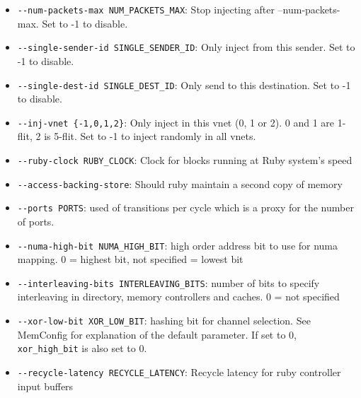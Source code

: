 \documentclass{article}
\begin{document}
\begin{itemize}
	\item \verb|--num-packets-max NUM_PACKETS_MAX|: Stop injecting after --num-packets-max. Set to -1 to disable.
	\item \verb|--single-sender-id SINGLE_SENDER_ID|: Only inject from this sender. Set to -1 to disable.
	\item \verb|--single-dest-id SINGLE_DEST_ID|: Only send to this destination. Set to -1 to disable.
	\item \verb|--inj-vnet {-1,0,1,2}|: Only inject in this vnet (0, 1 or 2). 0 and 1 are 1-flit, 2 is 5-flit. Set to -1 to inject randomly in all vnets.
	\item \verb|--ruby-clock RUBY_CLOCK|: Clock for blocks running at Ruby system's speed
	\item \verb|--access-backing-store|: Should ruby maintain a second copy of memory
	\item \verb|--ports PORTS|: used of transitions per cycle which is a proxy for the number of ports.
	\item \verb|--numa-high-bit NUMA_HIGH_BIT|: high order address bit to use for numa mapping. 0 = highest bit, not specified = lowest bit
	\item \verb|--interleaving-bits INTERLEAVING_BITS|: number of bits to specify interleaving in directory, memory controllers and caches. 0 = not specified
	\item \verb|--xor-low-bit XOR_LOW_BIT|: hashing bit for channel selection. See MemConfig for explanation of the default parameter. If set to 0, \verb|xor_high_bit| is also set to 0.

	\item \verb|--recycle-latency RECYCLE_LATENCY|: Recycle latency for ruby controller input buffers


\end{itemize}
\end{document}
